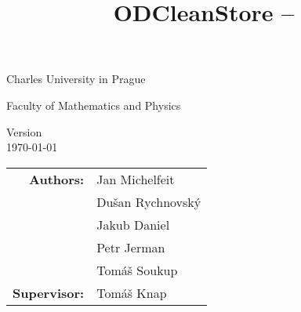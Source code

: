 \title{ODCleanStore -- \documentname}

\begin{titlepage}
\begin{center}

\large
Charles University in Prague

\smallskip

Faculty of Mathematics and Physics





\begin{spacing}{1.5} 
{\bf\Huge \documentname}
\end{spacing}

Version \version\\
\today


\begin{tabular}{rl}

\textbf{Authors:} & Jan Michelfeit \\
& Du\v san Rychnovsk\'y\\
& Jakub Daniel\\
& Petr Jerman\\
& Tom\' a\v s Soukup\\
\noalign{\vspace{3mm}}
\textbf{Supervisor:} & Tom\' a\v s Knap
\end{tabular}

\end{center}
\end{titlepage}

\newpage